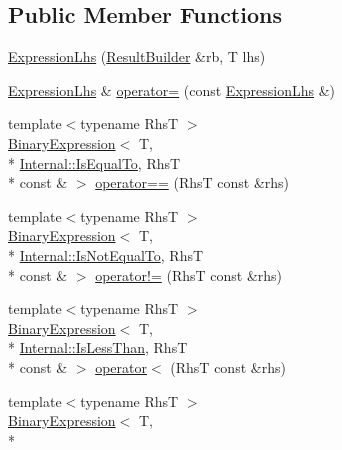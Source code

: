 \subsection*{Public Member Functions}
\begin{DoxyCompactItemize}
\item 
\hyperlink{classCatch_1_1ExpressionLhs_aa829588def6146a94fb75de9c4cc482a}{Expression\-Lhs} (\hyperlink{classCatch_1_1ResultBuilder}{Result\-Builder} \&rb, T lhs)
\item 
\hyperlink{classCatch_1_1ExpressionLhs}{Expression\-Lhs} \& \hyperlink{classCatch_1_1ExpressionLhs_a60d50fe8adcaabcb7c93747ddbae5993}{operator=} (const \hyperlink{classCatch_1_1ExpressionLhs}{Expression\-Lhs} \&)
\item 
{\footnotesize template$<$typename Rhs\-T $>$ }\\\hyperlink{classCatch_1_1BinaryExpression}{Binary\-Expression}$<$ T, \\*
\hyperlink{namespaceCatch_1_1Internal_ae3f96598a7858155750bf38e7295d83ea30e0accba6ec8384f4383b04dd2a6a9e}{Internal\-::\-Is\-Equal\-To}, Rhs\-T \\*
const \& $>$ \hyperlink{classCatch_1_1ExpressionLhs_abebe4afc079c91ae548ab8fdba6c77f2}{operator==} (Rhs\-T const \&rhs)
\item 
{\footnotesize template$<$typename Rhs\-T $>$ }\\\hyperlink{classCatch_1_1BinaryExpression}{Binary\-Expression}$<$ T, \\*
\hyperlink{namespaceCatch_1_1Internal_ae3f96598a7858155750bf38e7295d83ea1e1699cf7d3dbee0908f1a123da2456d}{Internal\-::\-Is\-Not\-Equal\-To}, Rhs\-T \\*
const \& $>$ \hyperlink{classCatch_1_1ExpressionLhs_a3bc08bb2b9c27678e2628faa73645144}{operator!=} (Rhs\-T const \&rhs)
\item 
{\footnotesize template$<$typename Rhs\-T $>$ }\\\hyperlink{classCatch_1_1BinaryExpression}{Binary\-Expression}$<$ T, \\*
\hyperlink{namespaceCatch_1_1Internal_ae3f96598a7858155750bf38e7295d83eabbbfc41706595e50acbefa8408004b93}{Internal\-::\-Is\-Less\-Than}, Rhs\-T \\*
const \& $>$ \hyperlink{classCatch_1_1ExpressionLhs_a919c48e52ff1be5f7329920d4da8e92f}{operator$<$} (Rhs\-T const \&rhs)
\item 
{\footnotesize template$<$typename Rhs\-T $>$ }\\\hyperlink{classCatch_1_1BinaryExpression}{Binary\-Expression}$<$ T, \\*

\end{DoxyCompactItemize}
